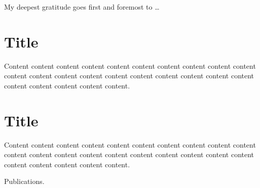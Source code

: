 \documentclass[degree=bachelor,language=english]{sysuthesis}
\begin{document}
\begin{acknowledgements}
  My deepest gratitude goes first and foremost to …
\end{acknowledgements}


\statement


\appendix

\chapter{Title}

Content content content content content content content content content content content content content content content content content content content content content content content content content.




\chapter{Title}

Content content content content content content content content content content content content content content content content content content content content content content content content content.


\begin{resume}
  Publications.
\end{resume}


\clearpage
\OMIT
\end{document}
